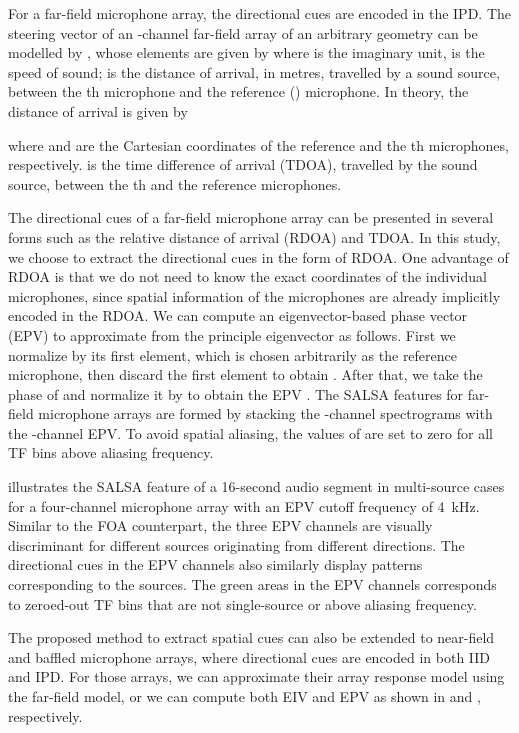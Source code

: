 \documentclass[journal]{IEEEtran}
\begin{document}
For a far-field microphone array, the directional cues are encoded in the IPD. The steering vector of an -channel far-field array of an arbitrary geometry can be modelled by , whose elements are given by
 \nobreak
where  is the imaginary unit,  is the speed of sound;  is the distance of arrival, in metres, travelled by a sound source, between the th microphone and the reference () microphone. In theory, the distance of arrival is given by

where  and  are the Cartesian coordinates of the reference and the th microphones, respectively.  is the time difference of arrival (TDOA), travelled by the sound source, between the th and the reference microphones. 

The directional cues of a far-field microphone array can be presented in several forms such as the relative distance of arrival (RDOA) and TDOA. In this study, we choose to extract the directional cues in the form of RDOA. One advantage of RDOA is that we do not need to know the exact coordinates of the individual microphones, since spatial information of the microphones are already implicitly encoded in the RDOA. We can compute an eigenvector-based phase vector (EPV) to approximate  from the principle eigenvector  as follows. First we normalize  by its first element, which is chosen arbitrarily as the reference microphone, then discard the first element to obtain . After that, we take the phase of  and normalize it by  to obtain the EPV . The SALSA features for {far-field microphone arrays} are formed by stacking the -channel spectrograms with the -channel EPV. To avoid spatial aliasing, the values of  are set to zero for all TF bins above aliasing frequency. 

 illustrates the SALSA feature of a \num{16}-second audio segment in multi-source cases for a four-channel microphone array with an EPV cutoff frequency of \SI{4}{\kilo\hertz}. Similar to the FOA counterpart, the three EPV channels are visually discriminant for different sources originating from different directions. The directional cues in the EPV channels also similarly display patterns corresponding to the sources. The green areas in the EPV channels corresponds to zeroed-out TF bins that are not {single-source} or above aliasing frequency. 

The proposed method to extract spatial cues can also be extended to near-field and baffled microphone arrays, where directional cues are encoded in both IID and IPD. For those arrays, we can approximate their array response model using the far-field model, or we can compute both EIV and EPV as shown in  and , respectively.  
\end{document}
